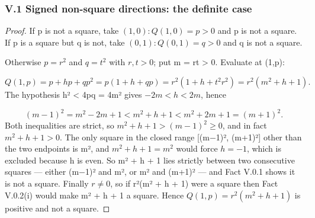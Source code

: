 \subsubsection*{V.1 Signed non-square directions: the definite case}
\renewcommand{\thePart}{V.\arabic{Part}}
\setcounter{Part}{0}
\begin{proof}
If p is not a square, take $(1,0): Q(1,0) = p > 0$ and p is not a square. If p is a square but q is not, take $(0,1): Q(0,1) = q > 0$ and q is not a square.

Otherwise $p = r^{2}$ and $q = t^{2}$ with $r, t > 0$; put m = rt > 0. Evaluate at (1,p):

\[
Q(1,p) = p + hp + qp^{2} = p(1 + h + qp) = r^{2}(1 + h + t^{2}r^{2}) = r^{2}(m^{2} + h + 1).
\]
The hypothesis h² < 4pq = 4m² gives $−2m < h < 2m$, hence

\[
(m−1)^{2} = m^{2} − 2m + 1 < m^{2} + h + 1 < m^{2} + 2m + 1 = (m+1)^{2}.
\]
Both inequalities are strict, so $m^{2} + h + 1 > (m−1)^{2} ≥ 0$, and in fact $m^{2} + h + 1 > 0$. The only square in the closed range [(m−1)², (m+1)²] other than the two endpoints is m², and $m^{2} + h + 1 = m^{2}$ would force $h = −1$, which is excluded because h is even. So m² + h + 1 lies strictly between two consecutive squares — either (m−1)² and m², or m² and (m+1)² — and Fact V.0.1 shows it is not a square. Finally $r ≠ 0$, so if r²(m² + h + 1) were a square then Fact V.0.2(i) would make m² + h + 1 a square. Hence $Q(1,p) = r^{2}(m^{2} + h + 1)$ is positive and not a square.

\end{proof}
